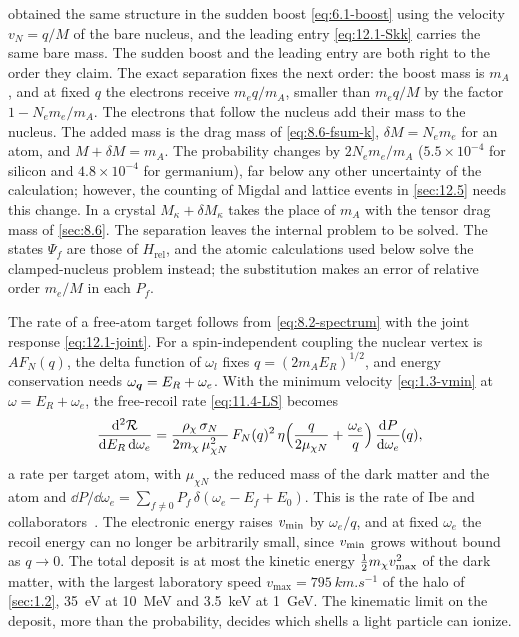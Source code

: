  obtained the same structure in the sudden boost \cref{eq:6.1-boost} using the velocity $v_N = q/M$ of the bare nucleus, and the leading entry \cref{eq:12.1-Skk} carries the same bare mass. The sudden boost and the leading entry are both right to the order they claim. The exact separation fixes the next order: the boost mass is $m_A$, and at fixed $q$ the electrons receive $m_eq/m_A$, smaller than $m_eq/M$ by the factor $1 - N_em_e/m_A$. The electrons that follow the nucleus add their mass to the nucleus. The added mass is the drag mass of \cref{eq:8.6-fsum-k}, $\delta M = N_em_e$ for an atom, and $M + \delta M = m_A$. The probability changes by $2N_em_e/m_A$ ($5.5\times10^{-4}$ for silicon and $4.8\times10^{-4}$ for germanium), far below any other uncertainty of the calculation; however, the counting of Migdal and lattice events in \cref{sec:12.5} needs this change. In a crystal $M_\kappa + \delta M_\kappa$ takes the place of $m_A$ with the tensor drag mass of \cref{sec:8.6}. The separation leaves the internal problem to be solved. The states $\Psi_f$ are those of $H_{\mathrm{rel}}$, and the atomic calculations used below solve the clamped-nucleus problem instead; the substitution makes an error of relative order $m_e/M$ in each $P_f$.

The rate of a free-atom target follows from \cref{eq:8.2-spectrum} with the joint response \cref{eq:12.1-joint}. For a spin-independent coupling the nuclear vertex is $AF_N(q)$, the delta function of $\omega_l$ fixes $q = (2m_AE_R)^{1/2}$, and energy conservation needs $\omega_{\bm{q}} = E_R + \omega_e$. With the minimum velocity \cref{eq:1.3-vmin} at $\omega = E_R + \omega_e$, the free-recoil rate \cref{eq:11.4-LS} becomes
\begin{equation}
  \frac{\mathrm{d}^2\mathcal{R}}{\mathrm{d} E_R\,\mathrm{d}\omega_e} = \frac{\rho_\chi\,\sigma_N}{2m_{\chi}\,\mu_{\chi N}^2}\,F_N(q)^2\,\eta\Bigl(\frac{q}{2\mu_{\chi N}} + \frac{\omega_e}{q}\Bigr)\,\frac{\mathrm{d} P}{\mathrm{d}\omega_e}(q) ,
  \label{eq:12.2-rate}
\end{equation}
a rate per target atom, with $\mu_{\chi N}$ the reduced mass of the dark matter and the atom and $\dd P/\dd\omega_e = \sum_{f\neq0}P_f\,\delta(\omega_e - E_f + E_0)$. This is the rate of Ibe and collaborators~\cite[Eqs.~(91) and (92)]{ibe2018migdal}. The electronic energy raises $v_{\mathrm{min}}$ by $\omega_e/q$, and at fixed $\omega_e$ the recoil energy can no longer be arbitrarily small, since $v_{\mathrm{min}}$ grows without bound as $q \to 0$. The total deposit is at most the kinetic energy $\frac12m_{\chi} v_{\mathrm{max}}^2$ of the dark matter, with the largest laboratory speed $v_{\mathrm{max}} = \SI{795}{km.s^{-1}}$ of the halo of \cref{sec:1.2}, \SI{35}{eV} at \SI{10}{MeV} and \SI{3.5}{keV} at \SI{1}{GeV}. The kinematic limit on the deposit, more than the probability, decides which shells a light particle can ionize.

